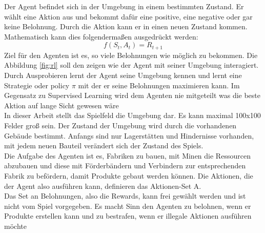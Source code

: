 Der Agent befindet sich in der Umgebung in einem bestimmten Zustand. Er wählt eine Aktion aus und bekommt dafür eine positive, eine negative oder gar keine Belohnung. Durch die Aktion kann er in einen neuen Zustand kommen. Mathematisch kann dies folgendermaßen ausgedrückt werden:
\begin{equation}
	f(S_t,A_t)= R_{t+1}
\end{equation}
Ziel für den Agenten ist es, so viele Belohnungen wie möglich zu bekommen. Die Abbildung \ref{fig:rl} soll den zeigen wie der Agent mit seiner Umgebung interagiert.
Durch Ausprobieren lernt der Agent seine Umgebung kennen und lernt eine Strategie oder policy $\pi$ mit der er seine Belohnungen maximieren kann. Im Gegensatz zu Supervised Learning wird dem Agenten nie mitgeteilt was die beste Aktion auf lange Sicht gewesen wäre  
\\
In dieser Arbeit stellt das Spielfeld die Umgebung dar. Es kann maximal 100x100 Felder groß sein. Der Zustand der Umgebung wird durch die vorhandenen Gebäude  bestimmt. Anfangs sind nur Lagerstätten und Hindernisse vorhanden, mit jedem neuen Bauteil verändert sich der Zustand des Spiels.
\\
Die Aufgabe des Agenten ist es, Fabriken zu bauen, mit Minen die Ressourcen abzubauen und diese mit Förderbändern und Verbindern zur entsprechenden Fabrik zu befördern, damit Produkte gebaut werden können.
Die Aktionen, die der Agent also ausführen kann, definieren das Aktionen-Set A.
\\
Das Set an Belohnungen, also die Rewards, kann frei gewählt werden und ist nicht vom Spiel vorgegeben. Es macht Sinn den Agenten zu belohnen, wenn er Produkte erstellen kann und zu bestrafen, wenn er illegale Aktionen ausführen möchte


